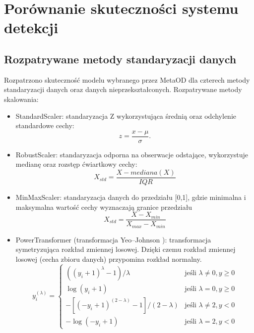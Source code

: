 \section{Porównanie skuteczności systemu detekcji}
\subsection{Rozpatrywane metody standaryzacji danych}
\label{minimen}
Rozpatrzono skuteczność modelu wybranego przez MetaOD dla czterech metody standaryzacji danych oraz danych nieprzekształconych.
Rozpatrywane metody skalowania:
\begin{itemize}
    \item StandardScaler: standaryzacja Z wykorzystująca średnią oraz odchylenie standardowe cechy:\begin{equation}
        z=\frac{x-\mu}{\sigma}. 
    \end{equation}
    \item RobustScaler: standaryzacja odporna na obserwacje odstające, wykorzystuje medianę oraz rozstęp ćwiartkowy cechy:
    \begin{equation}
            X_{std}=\frac{X-mediana(X)}{IQR}
    \end{equation}
    
    \item MinMaxScaler: standaryzacja danych do przedziału [0,1], gdzie minimalna i maksymalna wartość cechy wyznaczają granice przedziału  \begin{equation}
    \label{mms}
        X_{std} = \frac{X - X_{min}}{X_{max} - X_{min}}
    \end{equation}    
    \item PowerTransformer (transformacja Yeo–Johnson \cite{yeo2000new}): transformacja symetryzująca rozkład zmiennej losowej. Dzięki czemu rozkład zmiennej losowej (cecha zbioru danych) przypomina rozkład normalny.
    \begin{equation}
    y_i^{(\lambda)} = \begin{cases} ((y_i+1)^\lambda-1)/\lambda                      &  \text{jeśli }\lambda \neq 0, y \geq 0 \\ 
                                \log(y_i + 1)                                    &  \text{jeśli }\lambda =    0, y \geq 0 \\ 
                                -[(-y_i + 1)^{(2-\lambda)} - 1] / (2 - \lambda)  &  \text{jeśli }\lambda \neq 2, y <    0 \\ 
                                -\log(-y_i + 1)                                  &  \text{jeśli }\lambda =    2, y <    0 
                  \end{cases}
    \end{equation}
\end{itemize}



